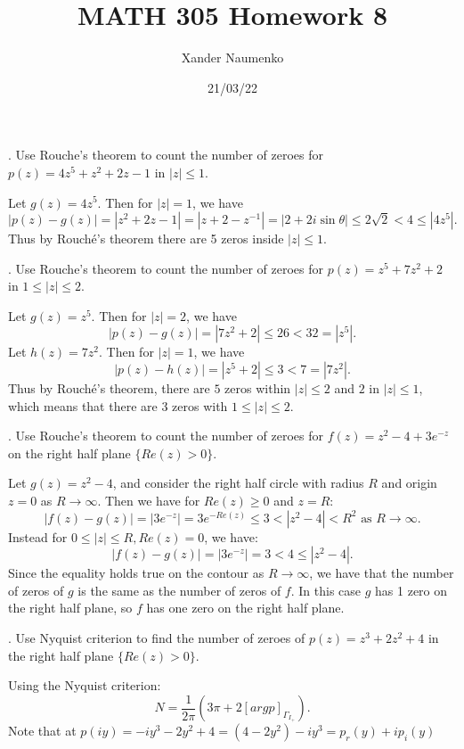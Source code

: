 \documentclass[letterpaper, reqno,11pt]{article}
\begin{document}
\title{MATH 305 Homework 8}
\date{21/03/22}
\author{Xander Naumenko}
\maketitle

. Use Rouche's theorem to count the number of zeroes for $ p(z)= 4z^5+z^2+2z-1 $ in $|z|\leq 1$.

Let $g(z)=4z^{5}$. Then for $\left| z \right| =1$, we have 
\[
\left| p(z)-g(z) \right| =\left| z^2+2z-1 \right|=\left| z+2-z^{-1} \right|=\left| 2+2i\sin\theta \right|   \leq 2\sqrt{2} <4\leq |4z^{5}|
.\]
Thus by Rouch\'e's theorem there are 5 zeros inside $|z|\leq 1$. 

\medskip



. Use Rouche's theorem to count the number of zeroes for $ p(z)= z^5 + 7 z^2+2 $ in $ 1\leq |z| \leq 2 $.

Let $g(z)=z^{5}$. Then for $|z|=2$, we have 
\[
\left| p(z)-g(z) \right| =|7z^2+2|\leq 26<32=|z^{5}|
.\]
Let $h(z)=7z^2$. Then for $|z|=1$, we have 
 \[
\left| p(z)-h(z) \right| =|z^{5}+2|\leq 3 <7=|7z^{2}|
.\]
Thus by Rouch\'e's theorem, there are $5$ zeros within $|z|\leq 2$ and $2$ in $|z|\leq 1$, which means that there are 3 zeros with $1\leq|z|\leq 2$. 


\medskip

. Use Rouche's theorem to count the number of zeroes for $ f(z)= z^2-4 + 3 e^{-z}$ on the right half plane $ \{ Re (z)>0\}$.

Let $g(z)=z^2-4$, and consider the right half circle with radius $R$ and origin $z=0$ as $R\to\infty$. Then we have for $Re(z)\geq 0$ and $z=R$: 
\[
\left| f(z)-g(z) \right| =\left| 3e^{-z} \right| =3 e^{-Re(z)}\leq 3<\left| z^2-4 \right|<R^2\text{ as }R\to\infty
.\]
Instead for $0\leq |z|\leq R, Re(z)=0$, we have: 
 \[
\left| f(z)-g(z) \right| =\left| 3e^{-z} \right| =3<4\leq \left| z^2-4 \right|
.\]
Since the equality holds true on the contour as $R\to\infty$, we have that the number of zeros of $g$ is the same as the number of zeros of $f$. In this case $g$ has 1 zero on the right half plane, so $f$ has one zero on the right half plane. 

\medskip

. Use Nyquist criterion to find the number of zeroes of $ p(z)= z^3+2z^2 +4$ in the right half plane $ \{ Re(z)>0\}$.

Using the Nyquist criterion: 
\[
N=\frac{1}{2\pi}\left( 3\pi+2[arg p]_{\Gamma_{I_+}} \right) 
.\]
Note that at $p(iy)=-iy^3-2y^2+4=(4-2y^2)-iy^3=p_r(y)+ip_i(y)$
\end{document}

